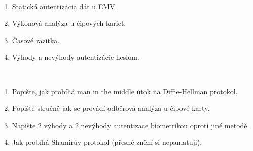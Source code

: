 \documentclass[11pt,a4paper]{article}
\begin{document}
\hfill\\[-10mm]

\begin{enumerate}
    \item Statická autentizácia dát u EMV.\\[-7.5mm]
    \item Výkonová analýza u čipových kariet.\\[-7.5mm]
    \item Časové razítka.\\[-7.5mm]
    \item Výhody a nevýhody autentizácie heslom.\\[-7.5mm]
\end{enumerate}

\hfill\\[-10mm]

\begin{enumerate}
    \item Popište, jak probíhá man in the middle útok na Diffie-Hellman protokol.\\[-7.5mm]
    \item Popište stručně jak se provádí odběrová analýza u čipové karty.\\[-7.5mm]
    \item Napište 2 výhody a 2 nevýhody autentizace biometrikou oproti jiné metodě.\\[-7.5mm]
    \item Jak probíhá Shamirův protokol (přesné znění si nepamatuji).\\[-7.5mm]
\end{enumerate}
\end{document}
